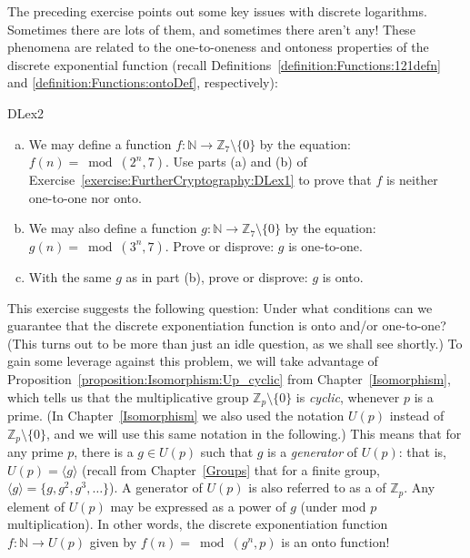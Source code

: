 The preceding exercise points out some key issues with discrete logarithms. Sometimes there are lots of them, and sometimes there aren't any! These phenomena are related to the one-to-oneness and ontoness properties of  the discrete exponential function (recall Definitions~\ref{definition:Functions:121defn} and \ref{definition:Functions:ontoDef}, respectively):

\begin{exercise}{DLex2}
\begin{enumerate}[(a)]
\item
We may define a function $f: \mathbb{N} \rightarrow \mathbb{Z}_7 \setminus \{0\}$ by the equation: $f(n) = \bmod(2^n,7)$. 
Use parts (a) and (b) of Exercise~\ref{exercise:FurtherCryptography:DLex1} to prove that $f$ is neither one-to-one nor onto.
\item
We may also define a function $g: \mathbb{N} \rightarrow \mathbb{Z}_7 \setminus \{0\}$ by the equation: $g(n) = \bmod(3^n,7)$. 
Prove or disprove: $g$ is one-to-one.
\item
With the same $g$ as in part (b), prove or disprove: $g$ is onto.
\end{enumerate}
\end{exercise}

This exercise suggests the following question:  Under what conditions can we guarantee that the discrete exponentiation function is onto and/or one-to-one? (This turns out to be more than just an idle question, as we shall see shortly.)  To gain some leverage against this problem, we will take advantage of   Proposition~\ref{proposition:Isomorphism:Up_cyclic} from Chapter~\ref{Isomorphism}, which tells us that the multiplicative group $\mathbb{Z}_p\setminus \{0\}$ is \emph{cyclic}, whenever $p$ is a prime. (In Chapter~\ref{Isomorphism} we also used the notation $U(p)$ instead of $\mathbb{Z}_p\setminus \{0\}$, and we will use this same notation in the following.) This means that for any prime $p$, there is a $g \in U(p)$  such that $g$ is a \emph{generator} of  $U(p)$: that is, $U(p) = \langle g \rangle$ (recall from Chapter~\ref{Groups} that for a finite group, $\langle g \rangle = \{g, g^2, g^3, \ldots \}$). A generator of $U(p)$ is also referred to as a  of $\mathbb{Z}_p$. Any element of $U(p)$ may be expressed as a power of $g$ (under mod $p$ multiplication).  In other words, the discrete exponentiation function $f: \mathbb{N} \rightarrow U(p)$ given by $f(n) = \bmod(g^n,p)$ is an onto function!  


